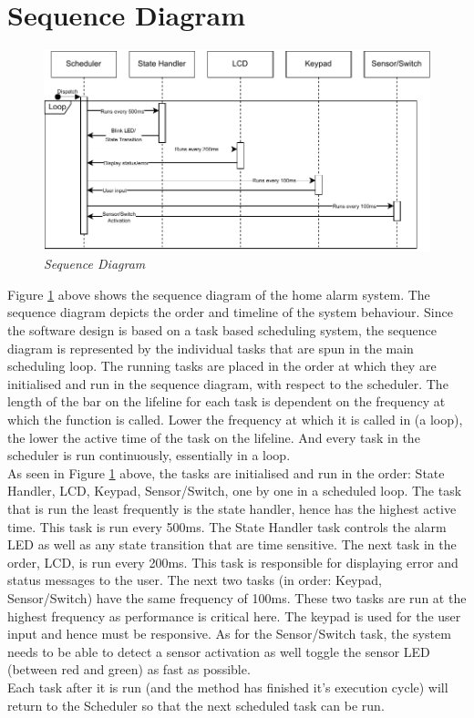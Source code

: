 \documentclass[aps, secnumarabic, balancelastpage, asmath, amssymb, nofootinbib, floatfix,]{revtex4-2}
\begin{document}
{\clearpage

\section{\fontsize{11.3pt}{12pt}\selectfont \bf Sequence Diagram}
\fontsize{11pt}{12pt}\selectfont
\label{sec:4}

\begin{figure}[h]
  \centering
  \includegraphics[scale = 1.2]{seq.drawio.pdf}
  \caption{\em Sequence Diagram}
  \label{fig:image3}
\end{figure}

Figure \ref{fig:image3} above shows the sequence diagram of the home alarm system. The sequence diagram depicts the order and timeline of the system behaviour. Since the software design is based on a task based scheduling system, the sequence diagram is represented by the individual tasks that are spun in the main scheduling loop. The running tasks are placed in the order at which they are initialised and run in the sequence diagram, with respect to the scheduler. The length of the bar on the lifeline for each task is dependent on the frequency at which the function is called. Lower the frequency at which it is called in (a loop), the lower the active time of the task on the lifeline. And every task in the scheduler is run continuously, essentially in a loop.~\\
As seen in Figure \ref{fig:image3} above, the tasks are initialised and run in the order: State Handler, LCD, Keypad, Sensor/Switch, one by one in a scheduled loop. The task that is run the least frequently is the state handler, hence has the highest active time. This task is run every 500ms. The State Handler task controls the alarm LED as well as any state transition that are time sensitive. The next task in the order, LCD, is run every 200ms. This task is responsible for displaying error and status messages to the user. The next two tasks (in order: Keypad, Sensor/Switch) have the same frequency of 100ms. These two tasks are run at the highest frequency as performance is critical here. The keypad is used for the user input and hence must be responsive. As for the Sensor/Switch task, the system needs to be able to detect a sensor activation as well toggle the sensor LED (between red and green) as fast as possible.~\\
Each task after it is run (and the method has finished it's execution cycle) will return to the Scheduler so that the next scheduled task can be run.



}
\end{document}
